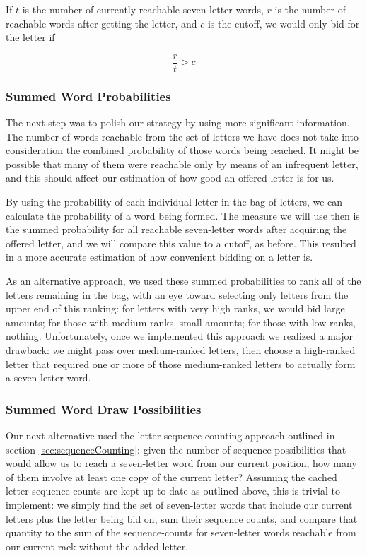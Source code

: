 \documentclass[11pt]{article}
\begin{document}
If $t$ is the number of currently reachable seven-letter words, $r$ is the number of reachable words after getting the letter, and $c$ is the cutoff, we would only bid for the letter if

$$\frac{r}{t}>c$$

\subsubsection{Summed Word Probabilities}

The next step was to polish our strategy by using more significant information. The number of words reachable from the set of letters we have does not take into consideration the combined probability of those words being reached. It might be possible that many of them were reachable only by means of an infrequent letter, and this should affect our estimation of how good an offered letter is for us.

By using the probability of each individual letter in the bag of letters, we can calculate the probability of a word being formed. 
The measure we will use then is the summed probability for all reachable seven-letter words after acquiring the offered letter, and we will compare this value to a cutoff, as before. This resulted in a more accurate estimation of how convenient bidding on a letter is.

As an alternative approach, we used these summed probabilities to rank all of the letters remaining in the bag, with an eye toward selecting only letters from the upper end of this ranking: for letters with very high ranks, we would bid large amounts; for those with medium ranks, small amounts; for those with low ranks, nothing.  Unfortunately, once we implemented this approach we realized a major drawback: we might pass over medium-ranked letters, then choose a high-ranked letter that required one or more of those medium-ranked letters to actually form a seven-letter word.

\subsubsection{Summed Word Draw Possibilities}

Our next alternative used the letter-sequence-counting approach outlined in section \ref{sec:sequenceCounting}: given the number of sequence possibilities that would allow us to reach a seven-letter word from our current position, how many of them involve at least one copy of the current letter?  Assuming the cached letter-sequence-counts are kept up to date as outlined above, this is trivial to implement: we simply find the set of seven-letter words that include our current letters plus the letter being bid on, sum their sequence counts, and compare that quantity to the sum of the sequence-counts for seven-letter words reachable from our current rack without the added letter.
\end{document}
